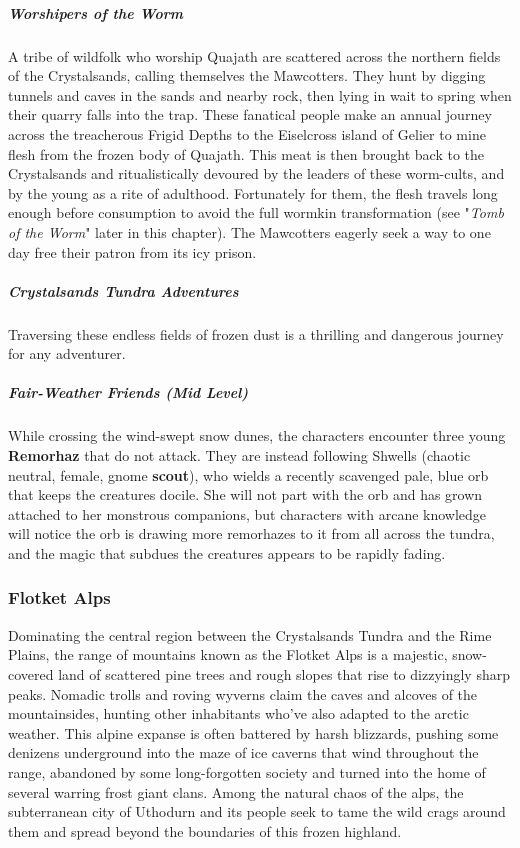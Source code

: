 \documentclass[10pt,a4paper,twoside,bg=print,twocolumn,openany,nodeprecatedcode]{dndbook}
\begin{document}
\subparagraph{Worshipers of the Worm}
A tribe of wildfolk who worship Quajath are scattered across the northern fields of the Crystalsands, calling themselves the Mawcotters. They hunt by digging tunnels and caves in the sands and nearby rock, then lying in wait to spring when their quarry falls into the trap. These fanatical people make an annual journey across the treacherous Frigid Depths to the Eiselcross island of Gelier to mine flesh from the frozen body of Quajath. This meat is then brought back to the Crystalsands and ritualistically devoured by the leaders of these worm-cults, and by the young as a rite of adulthood. Fortunately for them, the flesh travels long enough before consumption to avoid the full wormkin transformation (see "\textit{Tomb of the Worm}" later in this chapter). The Mawcotters eagerly seek a way to one day free their patron from its icy prison.

\subparagraph{Crystalsands Tundra Adventures}
Traversing these endless fields of frozen dust is a thrilling and dangerous journey for any adventurer.

\subparagraph{Fair-Weather Friends (Mid Level)}
While crossing the wind-swept snow dunes, the characters encounter three young \textbf{Remorhaz} that do not attack. They are instead following Shwells (chaotic neutral, female, gnome \textbf{scout}), who wields a recently scavenged pale, blue orb that keeps the creatures docile. She will not part with the orb and has grown attached to her monstrous companions, but characters with arcane knowledge will notice the orb is drawing more remorhazes to it from all across the tundra, and the magic that subdues the creatures appears to be rapidly fading.

\subsubsection{Flotket Alps}
Dominating the central region between the Crystalsands Tundra and the Rime Plains, the range of mountains known as the Flotket Alps is a majestic, snow-covered land of scattered pine trees and rough slopes that rise to dizzyingly sharp peaks. Nomadic trolls and roving wyverns claim the caves and alcoves of the mountainsides, hunting other inhabitants who've also adapted to the arctic weather. This alpine expanse is often battered by harsh blizzards, pushing some denizens underground into the maze of ice caverns that wind throughout the range, abandoned by some long-forgotten society and turned into the home of several warring frost giant clans. Among the natural chaos of the alps, the subterranean city of Uthodurn and its people seek to tame the wild crags around them and spread beyond the boundaries of this frozen highland.
\end{document}
